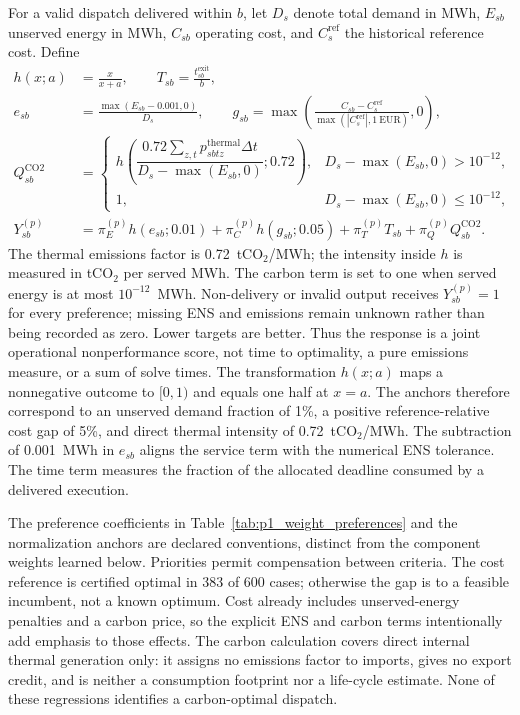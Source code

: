 For a valid dispatch delivered within $b$, let $D_s$ denote total demand
in MWh, $E_{sb}$ unserved energy in MWh, $C_{sb}$ operating cost, and
$C_s^{\mathrm{ref}}$ the historical reference cost. Define
\begin{equation}
\begin{aligned}
 h(x;a)&=\frac{x}{x+a},\qquad
 T_{sb}=\frac{t^{\mathrm{exit}}_{sb}}{b},\\
 e_{sb}&=\frac{\max(E_{sb}-0.001,0)}{D_s},\qquad
 g_{sb}=\max\!\left(\frac{C_{sb}-C_s^{\mathrm{ref}}}
 {\max(|C_s^{\mathrm{ref}}|,1\ \mathrm{EUR})},0\right),\\
 Q^{\mathrm{CO2}}_{sb}&=\begin{cases}
 h\!\left(\dfrac{0.72\sum_{z,t}p^{\mathrm{thermal}}_{sbtz}\Delta t}
 {D_s-\max(E_{sb},0)};0.72\right),&D_s-\max(E_{sb},0)>10^{-12},\\
 1,&D_s-\max(E_{sb},0)\leq10^{-12},
 \end{cases}\\
 Y^{(p)}_{sb}&=\pi^{(p)}_E h(e_{sb};0.01)
 +\pi^{(p)}_C h(g_{sb};0.05)+\pi^{(p)}_T T_{sb}
 +\pi^{(p)}_Q Q^{\mathrm{CO2}}_{sb}.
\end{aligned}
\label{eq:p1_joint_loss}
\end{equation}
The thermal emissions factor is 0.72~tCO$_2$/MWh; the intensity inside $h$
is measured in tCO$_2$ per served MWh. The carbon term is set to one when served energy
is at most $10^{-12}$~MWh. Non-delivery or invalid output receives
$Y^{(p)}_{sb}=1$ for every preference; missing ENS and emissions remain
unknown rather than being recorded as zero. Lower targets are better.
Thus the response is a joint operational nonperformance score, not time
to optimality, a pure emissions measure, or a sum of solve times.
The transformation $h(x;a)$ maps a nonnegative outcome to $[0,1)$ and
equals one half at $x=a$. The anchors therefore correspond to an unserved
demand fraction of 1\%, a positive reference-relative cost gap of 5\%,
and direct thermal intensity of 0.72~tCO$_2$/MWh. The subtraction of
0.001~MWh in $e_{sb}$ aligns the service term with the numerical ENS
tolerance. The time term measures the fraction of the allocated deadline
consumed by a delivered execution.

The preference coefficients in Table~\ref{tab:p1_weight_preferences} and
the normalization anchors are declared conventions, distinct from the
component weights learned below. Priorities permit compensation between
criteria. The cost reference is certified optimal in 383 of 600 cases;
otherwise the gap is to a feasible incumbent, not a known optimum. Cost
already includes unserved-energy penalties and a carbon price, so the
explicit ENS and carbon terms intentionally add emphasis to those effects.
The carbon calculation covers direct internal thermal generation only:
it assigns no emissions factor to imports, gives no export credit, and
is neither a consumption footprint nor a life-cycle estimate. None of
these regressions identifies a carbon-optimal dispatch.

